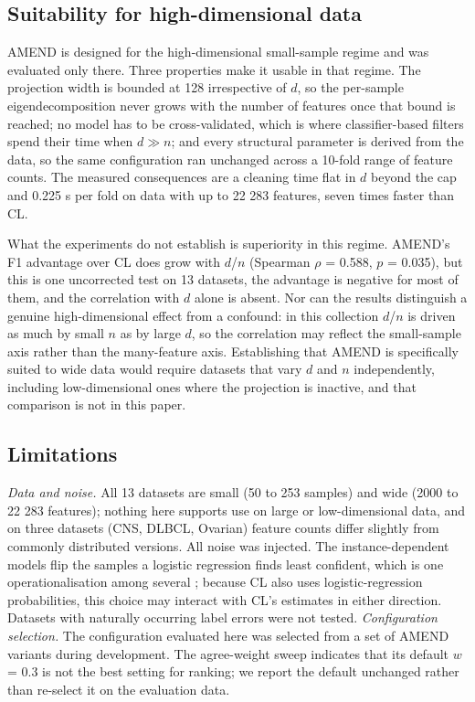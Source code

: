 \documentclass[conference]{IEEEtran}
\begin{document}
\subsection{Suitability for high-dimensional data}\label{sec:suitability-for-high-dimensional-data}

AMEND is designed for the high-dimensional small-sample regime and was evaluated only there. Three properties make it usable in that regime. The projection width is bounded at 128 irrespective of $d$, so the per-sample eigendecomposition never grows with the number of features once that bound is reached; no model has to be cross-validated, which is where classifier-based filters spend their time when $d \gg  n$; and every structural parameter is derived from the data, so the same configuration ran unchanged across a 10-fold range of feature counts. The measured consequences are a cleaning time flat in $d$ beyond the cap and 0.225 s per fold on data with up to 22 283 features, seven times faster than CL.

What the experiments do not establish is superiority in this regime. AMEND's F1 advantage over CL does grow with $d$/$n$ (Spearman $\rho $ = 0.588, $p$ = 0.035), but this is one uncorrected test on 13 datasets, the advantage is negative for most of them, and the correlation with $d$ alone is absent. Nor can the results distinguish a genuine high-dimensional effect from a confound: in this collection $d$/$n$ is driven as much by small $n$ as by large $d$, so the correlation may reflect the small-sample axis rather than the many-feature axis. Establishing that AMEND is specifically suited to wide data would require datasets that vary $d$ and $n$ independently, including low-dimensional ones where the projection is inactive, and that comparison is not in this paper.

\subsection{Limitations}\label{sec:limitations}

\emph{Data and noise.} All 13 datasets are small (50 to 253 samples) and wide (2000 to 22 283 features); nothing here supports use on large or low-dimensional data, and on three datasets (CNS, DLBCL, Ovarian) feature counts differ slightly from commonly distributed versions. All noise was injected. The instance-dependent models flip the samples a logistic regression finds least confident, which is one operationalisation among several \cite{song2023}; because CL also uses logistic-regression probabilities, this choice may interact with CL's estimates in either direction. Datasets with naturally occurring label errors were not tested. \emph{Configuration selection.} The configuration evaluated here was selected from a set of AMEND variants during development. The agree-weight sweep indicates that its default $w$ = 0.3 is not the best setting for ranking; we report the default unchanged rather than re-select it on the evaluation data.
\end{document}

